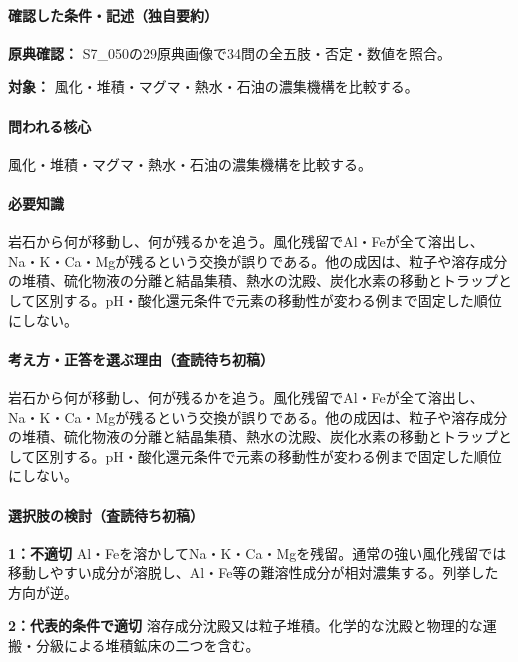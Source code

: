 \paragraph{確認した条件・記述（独自要約）}\mbox{}\par

\noindent\textbf{原典確認：} S7\_050の29原典画像で34問の全五肢・否定・数値を照合。\par

\noindent\textbf{対象：} 風化・堆積・マグマ・熱水・石油の濃集機構を比較する。\par

\paragraph{問われる核心} 風化・堆積・マグマ・熱水・石油の濃集機構を比較する。

\paragraph{必要知識} 岩石から何が移動し、何が残るかを追う。風化残留でAl・Feが全て溶出し、Na・K・Ca・Mgが残るという交換が誤りである。他の成因は、粒子や溶存成分の堆積、硫化物液の分離と結晶集積、熱水の沈殿、炭化水素の移動とトラップとして区別する。pH・酸化還元条件で元素の移動性が変わる例まで固定した順位にしない。

\paragraph{考え方・正答を選ぶ理由（査読待ち初稿）} 岩石から何が移動し、何が残るかを追う。風化残留でAl・Feが全て溶出し、Na・K・Ca・Mgが残るという交換が誤りである。他の成因は、粒子や溶存成分の堆積、硫化物液の分離と結晶集積、熱水の沈殿、炭化水素の移動とトラップとして区別する。pH・酸化還元条件で元素の移動性が変わる例まで固定した順位にしない。

\paragraph{選択肢の検討（査読待ち初稿）}\mbox{}\par

\noindent\textbf{1：不適切} Al・Feを溶かしてNa・K・Ca・Mgを残留。通常の強い風化残留では移動しやすい成分が溶脱し、Al・Fe等の難溶性成分が相対濃集する。列挙した方向が逆。\par

\noindent\textbf{2：代表的条件で適切} 溶存成分沈殿又は粒子堆積。化学的な沈殿と物理的な運搬・分級による堆積鉱床の二つを含む。\par

